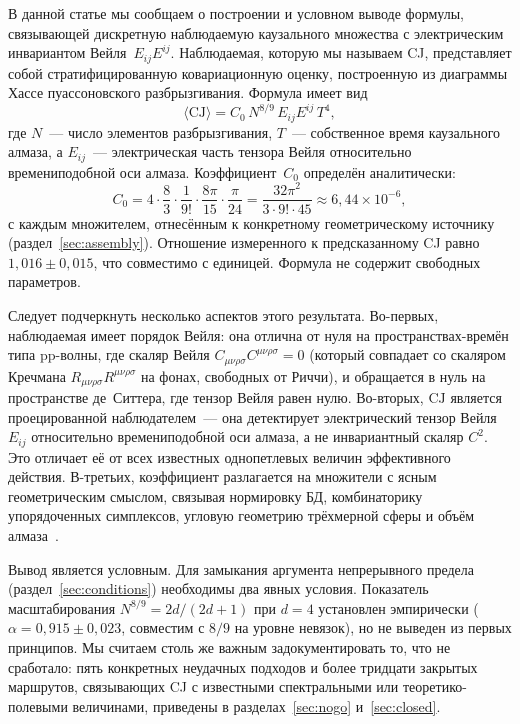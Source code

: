 \documentclass[12pt,a4paper]{article}
\theoremstyle{plain}
\theoremstyle{definition}
\theoremstyle{remark}
\newcommand{\Esq}{E_{ij}E^{ij}}
\newcommand{\CJ}{\mathrm{CJ}}
\begin{document}
В данной статье мы сообщаем о построении и условном выводе
формулы, связывающей дискретную наблюдаемую каузального
множества с электрическим инвариантом
Вейля~$\Esq$.  Наблюдаемая, которую мы называем CJ,
представляет собой стратифицированную ковариационную оценку,
построенную из диаграммы Хассе пуассоновского разбрызгивания.
Формула имеет вид
\begin{equation}\label{eq:bridge-intro}
  \langle \CJ \rangle
  = C_0\, N^{8/9}\, \Esq\, T^4,
\end{equation}
где $N$~--- число элементов разбрызгивания, $T$~---
собственное время каузального алмаза, а $E_{ij}$~---
электрическая часть тензора Вейля относительно времениподобной
оси алмаза.  Коэффициент~$C_0$ определён аналитически:
\begin{equation}\label{eq:C0-intro}
  C_0 = 4 \cdot \frac{8}{3} \cdot \frac{1}{9!}
        \cdot \frac{8\pi}{15} \cdot \frac{\pi}{24}
      = \frac{32\pi^2}{3 \cdot 9! \cdot 45}
      \approx 6{,}44 \times 10^{-6},
\end{equation}
с каждым множителем, отнесённым к конкретному геометрическому
источнику (раздел~\ref{sec:assembly}).  Отношение
измеренного к предсказанному CJ равно
$1{,}016 \pm 0{,}015$, что совместимо с единицей.  Формула
не содержит свободных параметров.

Следует подчеркнуть несколько аспектов этого результата.
Во-первых, наблюдаемая имеет порядок Вейля: она отлична
от нуля на пространствах-времён типа pp-волны, где скаляр
Вейля $C_{\mu\nu\rho\sigma}C^{\mu\nu\rho\sigma} = 0$
(который совпадает со скаляром Кречмана
$R_{\mu\nu\rho\sigma}R^{\mu\nu\rho\sigma}$ на фонах,
свободных от Риччи), и обращается в нуль на пространстве
де~Ситтера, где тензор Вейля равен нулю.  Во-вторых, $\CJ$
является проецированной наблюдателем~--- она детектирует
электрический тензор Вейля $E_{ij}$ относительно
времениподобной оси алмаза, а не инвариантный скаляр
$C^2$.  Это отличает её от всех известных однопетлевых
величин эффективного действия.  В-третьих, коэффициент
разлагается на множители с ясным геометрическим смыслом,
связывая нормировку БД, комбинаторику упорядоченных
симплексов, угловую геометрию трёхмерной сферы и объём
алмаза~\cite{Poisson:2011}.

Вывод является условным.  Для замыкания аргумента
непрерывного предела
(раздел~\ref{sec:conditions}) необходимы два явных условия.
Показатель масштабирования $N^{8/9} = 2d/(2d+1)$ при
$d = 4$ установлен эмпирически
($\alpha = 0{,}915 \pm 0{,}023$, совместим с $8/9$ на уровне
невязок), но не выведен из первых принципов.  Мы считаем
столь же важным задокументировать то, что не сработало: пять
конкретных неудачных подходов и более тридцати закрытых
маршрутов, связывающих CJ с известными спектральными или
теоретико-полевыми величинами, приведены в
разделах~\ref{sec:nogo} и~\ref{sec:closed}.
\end{document}
